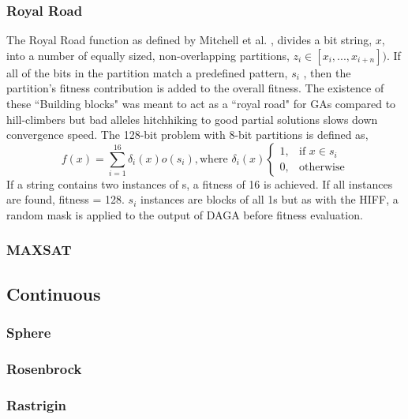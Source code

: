 \documentclass[runningheads,a4paper]{llncs}
\begin{document}
\subsubsection{Royal Road}
The Royal Road function as defined by Mitchell et al. \cite{mitchell}, divides a bit string, \(x\), into a number of  equally sized, non-overlapping partitions, \(z_i\in[x_i, ..., x_{i+n}])\). If all of the bits in the partition match a predefined pattern, \(s_i\) , then the partition's fitness contribution is added to the overall fitness. The existence of these ``Building blocks" was meant to act as a ``royal road" for GAs compared to hill-climbers but bad alleles hitchhiking to good partial solutions slows down convergence speed. The 128-bit problem with 8-bit partitions is defined as,
\\
\[
    f(x)= \sum_{i=1}^{16} \delta_i(x)o(s_i), \text{where } \delta_i(x)
\begin{cases}
    1,& \text{if } x\in s_i\\
    0,              & \text{otherwise}
\end{cases}
\] 
If a string contains two instances of s, a fitness of 16 is achieved. If all instances are found, fitness = 128. \(s_i\) instances are blocks of all 1s but as with the HIFF, a random mask is applied to the output of DAGA before fitness evaluation.
\subsubsection{MAXSAT}
\subsection{Continuous}
\subsubsection{Sphere}
\subsubsection{Rosenbrock}
\subsubsection{Rastrigin}
\end{document}

